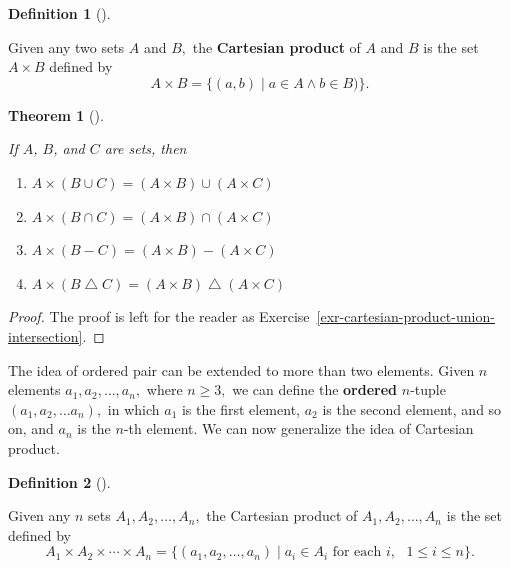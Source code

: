 \documentclass[
  letterpaper,
  10pt,
  reqno,
  twopage,
  openany]{book}
\providecommand{\tightlist}{%
  \setlength{\itemsep}{0pt}\setlength{\parskip}{0pt}}\usepackage{longtable,booktabs,array}
\theoremstyle{plain}
\theoremstyle{definition}
\theoremstyle{definition}
\newtheorem{definition}{Definition}[chapter]
\theoremstyle{definition}
\theoremstyle{plain}
\theoremstyle{plain}
\newtheorem{theorem}{Theorem}[chapter]
\theoremstyle{remark}
\begin{document}
\leavevmode{}%
\begin{definition}[]\label{def-cartesian-product}

Given any two sets \(A\) and \(B,\) the 
\textbf{Cartesian product} of \(A\) and \(B\) is the set \(A\times B\)
defined by \[
A\times B =\{(a,b)\mid a\in A \land b\in B)\}.
\]

\end{definition}

\leavevmode{}%
\begin{theorem}[]\label{thm-cartesian-product-union-intersection}

If \(A\), \(B\), and \(C\) are sets, then

\begin{enumerate}
\def\labelenumi{\arabic{enumi}.}
\tightlist
\item
  \(A\times (B\cup C)=(A\times B)\cup (A\times C)\)
\item
  \(A\times (B\cap C)=(A\times B)\cap (A\times C)\)
\item
  \(A\times (B- C)=(A\times B)- (A\times C)\)
\item
  \(A\times (B\bigtriangleup C)=(A\times B)\bigtriangleup (A\times C)\)
\end{enumerate}

\end{theorem}

\begin{proof}

The proof is left for the reader as
Exercise~\ref{exr-cartesian-product-union-intersection}.

\end{proof}

The idea of ordered pair can be extended to more than two elements.
Given \(n\) elements \(a_1, a_2, \ldots, a_n,\) where \(n\geq 3,\) we
can define the  \textbf{ordered} \(n\)-tuple
\((a_1, a_2, \ldots a_n),\) in which \(a_1\) is the first element,
\(a_2\) is the second element, and so on, and \(a_n\) is the \(n\)-th
element. We can now generalize the idea of Cartesian product.

\leavevmode{}%
\begin{definition}[]\label{def-cartesian-product}

Given any \(n\) sets \(A_1, A_2, \ldots, A_n,\) the Cartesian product of
\(A_1, A_2, \ldots, A_n\) is the set defined by \[
A_1\times A_2 \times \cdots \times A_n
=\{(a_1, a_2, \ldots, a_n) \mid a_i\in A_i \text{ for each $i,$ $1\leq i \leq n$}\}.
\]

\end{definition}
\end{document}

